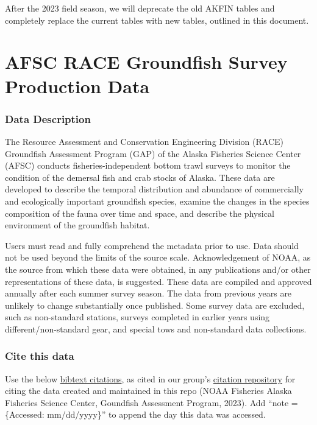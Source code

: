 \documentclass[
  letterpaper,
  oneside,
  open=any]{scrbook}
\begin{document}
After the 2023 field season, we will deprecate the old AKFIN tables and
completely replace the current tables with new tables, outlined in this
document.

\part{AFSC RACE Groundfish Survey Production Data}

\hypertarget{data-description}{%
\section*{Data Description}\label{data-description}}


The Resource Assessment and Conservation Engineering Division (RACE)
Groundfish Assessment Program (GAP) of the Alaska Fisheries Science
Center (AFSC) conducts fisheries-independent bottom trawl surveys to
monitor the condition of the demersal fish and crab stocks of Alaska.
These data are developed to describe the temporal distribution and
abundance of commercially and ecologically important groundfish species,
examine the changes in the species composition of the fauna over time
and space, and describe the physical environment of the groundfish
habitat.

Users must read and fully comprehend the metadata prior to use. Data
should not be used beyond the limits of the source scale.
Acknowledgement of NOAA, as the source from which these data were
obtained, in any publications and/or other representations of these
data, is suggested. These data are compiled and approved annually after
each summer survey season. The data from previous years are unlikely to
change substantially once published. Some survey data are excluded, such
as non-standard stations, surveys completed in earlier years using
different/non-standard gear, and special tows and non-standard data
collections.

\hypertarget{cite-this-data-1}{%
\section*{Cite this data}\label{cite-this-data-1}}


Use the below
\href{https://github.com/afsc-gap-products/gap_products/blob/main/code/CITATION_GAPProducts.bib}{bibtext
citations}, as cited in our group's
\href{https://github.com/afsc-gap-products/citations/blob/main/cite/bibliography.bib}{citation
repository} for citing the data created and maintained in this repo
(NOAA Fisheries Alaska Fisheries Science Center, Goundfish Assessment
Program, 2023). Add ``note = \{Accessed: mm/dd/yyyy\}'' to append the
day this data was accessed.
\end{document}
